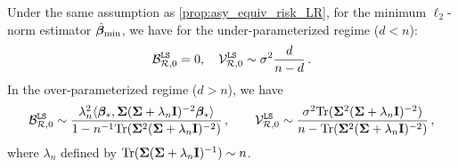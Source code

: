 \begin{proposition}\citep[Restatement of results in Sec 5]{bach2024high} \label{prop:asy_equiv_error_LR_minnorm} 
Under the same assumption as \cref{prop:asy_equiv_risk_LR}, for the minimum $\ell_2$-norm estimator $\hat{{\boldsymbol \beta}}_{\min}$, we have for the under-parameterized regime ($d<n$):
    \[
        \mathcal{B}_{\mathcal{R},0}^{\tt LS} = 0,\quad \mathcal{V}_{\mathcal{R},0}^{\tt LS} \sim \sigma^2\frac{d}{n-d}\,.
    \]
    In the over-parameterized regime ($d>n$), we have
    \[
        \mathcal{B}_{\mathcal{R},0}^{\tt LS} \sim \frac{\lambda_n^2\langle{\boldsymbol \beta}_*,{\boldsymbol \Sigma}({\boldsymbol \Sigma}+\lambda_n{\mathbf I})^{-2}{\boldsymbol \beta}_*\rangle}{1-n^{-1}{\rm Tr}({\boldsymbol \Sigma}^2({\boldsymbol \Sigma}+\lambda_n{\mathbf I})^{-2})}\,,\qquad
        \mathcal{V}_{\mathcal{R},0}^{\tt LS} \sim \frac{\sigma^2{\rm Tr}({\boldsymbol \Sigma}^2({\boldsymbol \Sigma}+\lambda_n{\mathbf I})^{-2})}{n-{\rm Tr}({\boldsymbol \Sigma}^2({\boldsymbol \Sigma}+\lambda_n{\mathbf I})^{-2})}\,,
    \]
    where $\lambda_n$ defined by ${\rm Tr}({\boldsymbol \Sigma}({\boldsymbol \Sigma}+\lambda_n{\mathbf I})^{-1}) \sim n$.
\end{proposition}